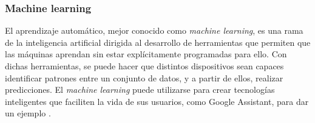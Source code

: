 \subsubsection{Machine learning}

El aprendizaje automático, mejor conocido como \textit{machine learning}, es una rama de la inteligencia artificial dirigida al desarrollo de herramientas que permiten que las máquinas aprendan sin estar explícitamente programadas para ello. Con dichas herramientas, se puede hacer que distintos dispositivos sean capaces identificar patrones entre un conjunto de datos, y a partir de ellos, realizar predicciones. El \textit{machine learning} puede utilizarse para crear tecnologías inteligentes que faciliten la vida de sus usuarios, como Google Assistant, para dar un ejemplo \cite{mnatraj}.
